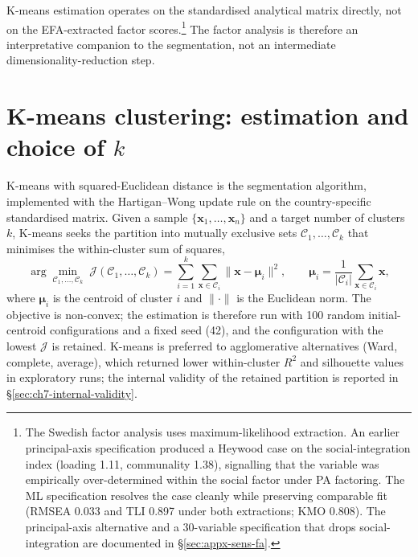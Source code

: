K-means estimation operates on the standardised analytical matrix directly, not on the EFA-extracted factor scores.\footnote{The Swedish factor analysis uses maximum-likelihood extraction. An earlier principal-axis specification produced a Heywood case on the social-integration index (loading 1.11, communality 1.38), signalling that the variable was empirically over-determined within the social factor under PA factoring. The ML specification resolves the case cleanly while preserving comparable fit (RMSEA 0.033 and TLI 0.897 under both extractions; KMO 0.808). The principal-axis alternative and a 30-variable specification that drops social-integration are documented in \S\ref{sec:appx-sens-fa}.} The factor analysis is therefore an interpretative companion to the segmentation, not an intermediate dimensionality-reduction step.

\section{K-means clustering: estimation and choice of \texorpdfstring{$k$}{k}}
\label{sec:ch3-kmeans}

K-means \citep{macqueen1967} with squared-Euclidean distance is the segmentation algorithm, implemented with the Hartigan--Wong update rule \citep{hartiganwong1979} on the country-specific standardised matrix. Given a sample $\{\mathbf{x}_1,\ldots,\mathbf{x}_n\}$ and a target number of clusters $k$, K-means seeks the partition into mutually exclusive sets $\mathcal{C}_1,\ldots,\mathcal{C}_k$ that minimises the within-cluster sum of squares,
\begin{equation}
  \arg\min_{\mathcal{C}_1,\ldots,\mathcal{C}_k}\;
  \mathcal{J}(\mathcal{C}_1,\ldots,\mathcal{C}_k)
  = \sum_{i=1}^{k} \sum_{\mathbf{x} \in \mathcal{C}_i}
    \bigl\|\mathbf{x} - \boldsymbol{\mu}_i\bigr\|^{2},
  \qquad
  \boldsymbol{\mu}_i = \frac{1}{|\mathcal{C}_i|}\sum_{\mathbf{x} \in \mathcal{C}_i}\mathbf{x},
\end{equation}
where $\boldsymbol{\mu}_i$ is the centroid of cluster $i$ and $\|\cdot\|$ is the Euclidean norm. The objective is non-convex; the estimation is therefore run with 100 random initial-centroid configurations and a fixed seed (42), and the configuration with the lowest $\mathcal{J}$ is retained. K-means is preferred to agglomerative alternatives (Ward, complete, average), which returned lower within-cluster $R^2$ and silhouette values in exploratory runs; the internal validity of the retained partition is reported in \S\ref{sec:ch7-internal-validity}.


